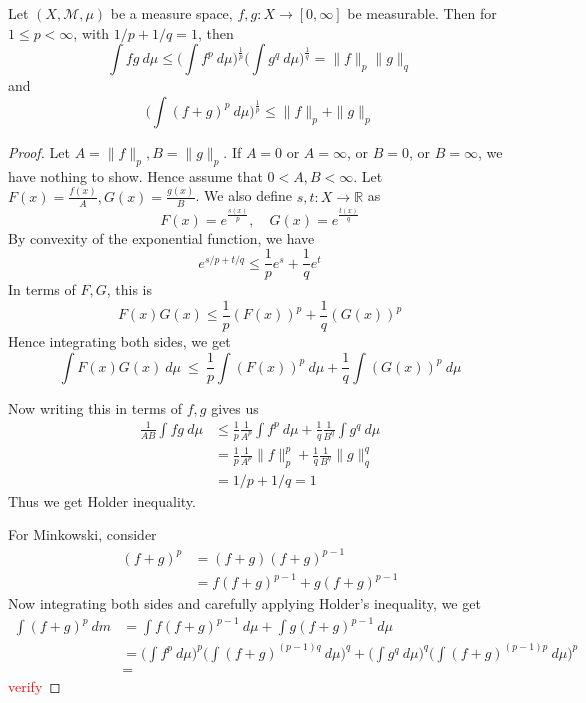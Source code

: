 
\chapter{}
\begin{theorem}
  Let $(X, \mathcal{M},  \mu)$ be a measure space, $f, g : X \to [0,
  \infty]$ be measurable. Then for $1 \le p < \infty$, with $1/p + 1/q
  = 1$, then \[
    \int  fg \ d \mu \le \Bigg(\int  f^p \ d \mu \Bigg)^{\frac{1}{p}}
    \Bigg(\int  g^q \ d \mu\Bigg)^{\frac{1}{q}} = \| f\|_p \|g\|_q
  \]
  and \[
    \Bigg(\int(f+g)^p \ d \mu\Bigg)^{\frac{1}{p}} \le \|f\|_p + \|g\|_p
  \]
\end{theorem}
\begin{proof}
  Let $A = \|f\|_p, B=\|g\|_p$. If $A = 0$ or $A = \infty$, or $ B =
  0$, or $ B = \infty$, we have nothing to show. Hence assume that $0
  < A, B < \infty$. Let $F(x) = \frac{f(x)}{A}, G(x) =
  \frac{g(x)}{B}$. We also define $ s, t : X \to \mathbb{R}$ as \[
    F(x) = e^{\frac{s(x)}{p}}, \quad G(x) = e^{\frac{t(x)}{q}}
  \]
  By convexity of the exponential function, we have $$e^{s/p + t/q}
  \le \frac{1}{p}e^s + \frac{1}{q}e^t$$
  In terms of $F, G$, this is \[
    F(x) G(x) \le \frac{1}{p}(F(x))^p + \frac{1}{q}(G(x))^p
  \]
  Hence integrating both sides, we get \[
    \int F(x) G(x) \ d \mu \  \le \ \frac{1}{p} \int (F(x))^p \ d \mu
    + \frac{1}{q} \int (G(x))^p \ d \mu
  \]

  Now writing this in terms of $f, g$ gives us
  \begin{align*}
    \frac{1}{AB} \int fg \ d \mu &\le \frac{1}{p} \frac{1}{A^p} \int
    f^p \ d \mu + \frac{1}{q} \frac{1}{B^q} \int g^q \ d \mu \\
    &= \frac{1}{p}\frac{1}{A^p}\|f\|_p^p + \frac{1}{q}\frac{1}{B^q} \|g\|_q^q \\
    &= 1/p + 1/q = 1
  \end{align*}
  Thus we get Holder inequality.

  For Minkowski, consider
  \begin{align*}
    (f+g)^p &= (f+g)(f+g)^{p-1} \\
    &= f(f+g)^{p-1} + g(f+g)^{p-1}
  \end{align*}
  Now integrating both sides and carefully applying Holder's inequality, we get
  \begin{align*}
    \int (f+g)^p \ d m &= \int f(f+g)^{p-1} \ d   \mu + \int
    g(f+g)^{p-1} \ d  \mu \\
    &= \Bigg(\int f^p \ d  \mu \Bigg)^p  \Bigg(\int
    (f+g)^{(p-1)q} \ d \mu \Bigg)^q + \Bigg(\int
    g^q  \ d \mu\Bigg)^{q} \Bigg(\int (f+g)^{(p-1)p} \ d \mu \Bigg)^{p} \\
    &=
  \end{align*}
  \textcolor{red}{verify}
\end{proof}

